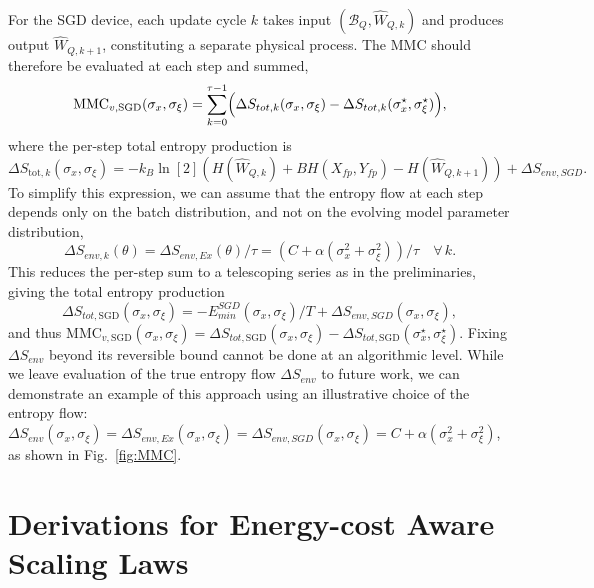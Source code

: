 \documentclass[12pt,onecolumn, margin=1in]{IEEEtran}
\begin{document}
For the SGD device, each update cycle $k$ takes input $(\mathcal{B}_Q, \hat{W}_{Q,k})$ and produces
output $\hat{W}_{Q,k+1}$, constituting a separate physical process. The MMC should
therefore be evaluated at each step and summed,
\begin{equation}
    \mathrm{MMC}_{v,\mathrm{SGD}}(\sigma_x,\sigma_\xi) = \sum_{k=0}^{\tau-1} \Bigl(\Delta S_{tot, k}(\sigma_x,\sigma_\xi) - \Delta S_{tot,k}(\sigma_x^\star,\sigma_\xi^\star)\Bigr),
\end{equation}
where the per-step total entropy production is
\begin{equation}
    \Delta S_{\mathrm{tot},k}(\sigma_x, \sigma_\xi)
    = 
    - k_B \ln[2]\left(H(\hat{W}_{Q,k}) + B H(X_{fp}, Y_{fp})
      - H(\hat{W}_{Q,k+1})\right) + \Delta S_{env,SGD}.
\end{equation}
To simplify this expression, we can assume that the entropy flow at each step depends only
on the batch distribution, and not on the evolving model parameter distribution,
\begin{equation}
    \Delta S_{env,k}(\theta) = \Delta S_{env,Ex}(\theta)/\tau =  (C + \alpha(\sigma_x^2 + \sigma_\xi^2))/\tau \quad \forall\, k.
\end{equation}
This reduces the per-step sum to a telescoping series as in the preliminaries, giving the total entropy production
\begin{equation}
    \Delta S_{tot,\mathrm{SGD}}(\sigma_x,\sigma_\xi) = -E^{SGD}_{min}(\sigma_x,\sigma_\xi)/T + \Delta S_{env,SGD}(\sigma_x,\sigma_\xi),
\end{equation}
and thus $\mathrm{MMC}_{v,\mathrm{SGD}}(\sigma_x,\sigma_\xi) = \Delta S_{tot,\mathrm{SGD}}(\sigma_x,\sigma_\xi) - \Delta S_{tot,\mathrm{SGD}}(\sigma_x^\star,\sigma_\xi^\star)$.
Fixing $\Delta S_{env}$ beyond its reversible bound cannot be done at an algorithmic level. While we leave evaluation of the true entropy flow $\Delta S_{env}$ to future work, we can demonstrate an example of this approach using an illustrative choice of the entropy flow: $\Delta S_{env}(\sigma_x,\sigma_\xi) = \Delta S_{env,Ex}(\sigma_x,\sigma_\xi) = \Delta S_{env,SGD}(\sigma_x,\sigma_\xi) = C + \alpha(\sigma_x^2 + \sigma_\xi^2)$, as shown in Fig.~\ref{fig:MMC}. 


\pagebreak
\FloatBarrier
\section{Derivations for Energy-cost Aware Scaling Laws}\label{sec:scaling_laws_app}
\end{document}
